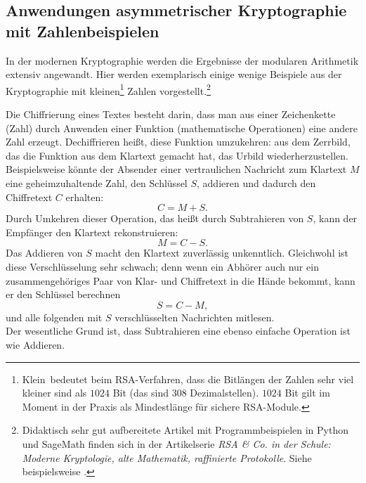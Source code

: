 \begin{refsegment}
\addtocounter{footnote}{0}

\section{Anwendungen asymmetrischer Kryptographie mit Zahlenbeispielen}

In der modernen Kryptographie  werden die Ergebnisse
der modularen Arithmetik extensiv angewandt. Hier werden exemplarisch einige
wenige Beispiele aus der Kryptographie mit kleinen\footnote{%
\glqq Klein\grqq~bedeutet beim RSA-Verfahren, dass die Bitlängen der Zahlen sehr
viel kleiner sind als $1024$ Bit (das sind $308$ Dezimalstellen).
$1024$ Bit gilt im Moment in der Praxis als Mindestlänge für sichere RSA-Module.
} Zahlen vorgestellt.\footnote{%
Didaktisch sehr gut aufbereitete Artikel mit Programmbeispielen in Python
und SageMath finden sich in der Artikelserie {\em RSA \& Co. in der Schule:
Moderne Kryptologie, alte Mathematik, raffinierte Protokolle}.
Siehe beispielsweise \cite{Witten2015}.
}

Die Chiffrierung eines Textes besteht darin, dass man aus einer Zeichenkette
(Zahl) durch Anwenden einer Funktion (mathematische Operationen) eine andere
Zahl erzeugt. Dechiffrieren heißt, diese Funktion umzukehren: aus dem
Zerrbild, das die Funktion aus dem Klartext gemacht hat, das Urbild
wiederherzustellen. Beispielsweise könnte der Absender einer vertraulichen
Nachricht zum Klartext $M$ eine geheimzuhaltende Zahl, den Schlüssel $S$,
addieren und dadurch den Chiffretext $C$ erhalten:
$$ C = M + S. $$
Durch Umkehren dieser Operation, das heißt durch Subtrahieren von $S$, kann
der Empfänger den Klartext rekonstruieren:
$$ M = C - S. $$
Das Addieren von $S$ macht den Klartext zuverlässig unkenntlich. Gleichwohl
ist diese Verschlüsselung sehr schwach; denn wenn ein Abhörer auch nur ein
zusammengehöriges Paar von Klar- und Chiffretext in die Hände bekommt, kann
er den Schlüssel berechnen
$$ S = C - M, $$
und alle folgenden mit $S$ verschlüsselten Nachrichten mitlesen.\\
Der wesentliche Grund ist, dass Subtrahieren eine ebenso einfache Operation
ist wie Addieren.




\end{refsegment}
